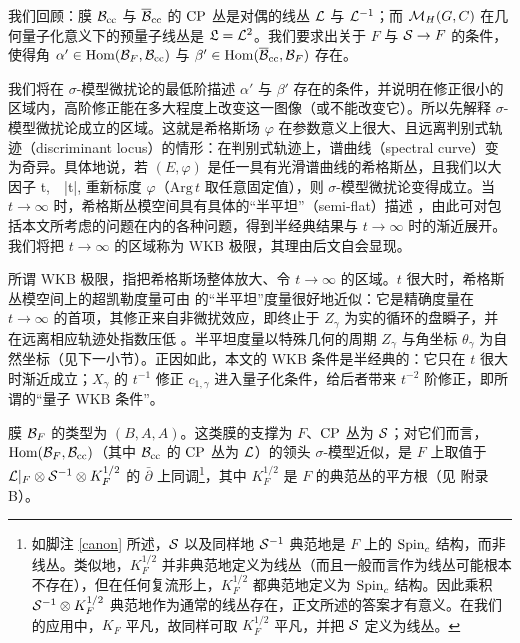 我们回顾：膜 $\B_\cc$ 与 $\b\B_\cc$ 的 $\CP$ 丛是对偶的线丛 $\L$ 与 $\L^{-1}$；而 $\M_H(G,C)$ 在几何量子化意义下的预量子线丛是 $\frL=\L^2$。我们要求出关于 $F$ 与 $\S\to F$ 的条件，使得角 $\alpha'\in \Hom(\B_F,\B_\cc)$ 与 $\beta'\in \Hom(\b\B_\cc,\B_F)$ 存在。

我们将在 $\sigma$-模型微扰论的最低阶描述 $\alpha'$ 与 $\beta'$ 存在的条件，并说明在修正很小的区域内，高阶修正能在多大程度上改变这一图像（或不能改变它）。所以先解释 $\sigma$-模型微扰论成立的区域。这就是希格斯场 $\varphi$ 在参数意义上很大、且远离判别式轨迹（discriminant locus）的情形：在判别式轨迹上，谱曲线（spectral curve）变为奇异。具体地说，若 $(E,\varphi)$ 是任一具有光滑谱曲线的希格斯丛，且我们以大因子
\be\label{kcf} \varphi\to t\varphi,~~|t|,\ee
重新标度 $\varphi$（$\mathrm{Arg}\,t$ 取任意固定值），则 $\sigma$-模型微扰论变得成立。当 $t\to\infty$ 时，希格斯丛模空间具有具体的“半平坦”（semi-flat）描述 \cite{GMN}，由此可对包括本文所考虑的问题在内的各种问题，得到半经典结果与 $t\to\infty$ 时的渐近展开。我们将把 $t\to\infty$ 的区域称为 WKB 极限，其理由后文自会显现。

\begin{yizhu}
所谓 WKB 极限，指把希格斯场整体放大、令 $t\to\infty$ 的区域。$t$ 很大时，希格斯丛模空间上的超凯勒度量可由 \cite{GMN} 的“半平坦”度量很好地近似：它是精确度量在 $t\to\infty$ 的首项，其修正来自非微扰效应，即终止于 $Z_\gamma$ 为实的循环的盘瞬子，并在远离相应轨迹处指数压低 \cite{Gaiotto:2008cd}。半平坦度量以特殊几何的周期 $Z_\gamma$ 与角坐标 $\theta_\gamma$ 为自然坐标（见下一小节）。正因如此，本文的 WKB 条件是半经典的：它只在 $t$ 很大时渐近成立；$X_\gamma$ 的 $t^{-1}$ 修正 $c_{1,\gamma}$ 进入量子化条件，给后者带来 $t^{-2}$ 阶修正，即所谓的“量子 WKB 条件”。
\end{yizhu}

膜 $\B_F$ 的类型为 $(B,A,A)$。这类膜的支撑为 $F$、$\CP$ 丛为 $\S$；对它们而言，$\Hom(\B_F,\B_\cc)$（其中 $\B_\cc$ 的 $\CP$ 丛为 $\L$）的领头 $\sigma$-模型近似，是 $F$ 上取值于 $\L|_F\otimes \S^{-1}\otimes K_F^{1/2}$ 的 $\bar\partial$ 上同调\footnote{如脚注 \ref{canon} 所述，$\S$ 以及同样地 $\S^{-1}$ 典范地是 $F$ 上的 $\Spin_c$ 结构，而非线丛。类似地，$K_F^{1/2}$ 并非典范地定义为线丛（而且一般而言作为线丛可能根本不存在），但在任何复流形上，$K_F^{1/2}$ 都典范地定义为 $\Spin_c$ 结构。因此乘积 $\S^{-1}\otimes K_F^{1/2}$ 典范地作为通常的线丛存在，正文所述的答案才有意义。在我们的应用中，$K_F$ 平凡，故同样可取 $K_F^{1/2}$ 平凡，并把 $\S$ 定义为线丛。}，其中 $K_F^{1/2}$ 是 $F$ 的典范丛的平方根（见 \cite{GW} 附录 B）。

